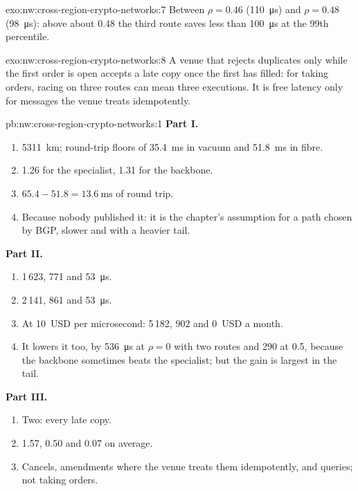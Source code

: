 \begin{solution}{exo:nw:cross-region-crypto-networks:7}
Between $\rho = 0.46$ (\qty{110}{\micro\second}) and $\rho = 0.48$ (\qty{98}{\micro\second}): above about 0.48 the third route saves less than
\qty{100}{\micro\second} at the 99th percentile.
\end{solution}

\begin{solution}{exo:nw:cross-region-crypto-networks:8}
A venue that rejects duplicates only while the first order is open accepts a late copy once the first has filled: for taking orders, racing on three
routes can mean three executions. It is free latency only for messages the venue treats idempotently.
\end{solution}

\begin{solution}{pb:nw:cross-region-crypto-networks:1}
\textbf{Part I.}
\begin{enumerate}
\item \qty{5311}{\kilo\metre}; round-trip floors of \qty{35.4}{\milli\second} in vacuum and \qty{51.8}{\milli\second} in fibre.
\item 1.26 for the specialist, 1.31 for the backbone.
\item $65.4 - 51.8 = \qty{13.6}{\milli\second}$ of round trip.
\item Because nobody published it: it is the chapter's assumption for a path chosen by BGP, slower and with a heavier tail.
\end{enumerate}
\textbf{Part II.}
\begin{enumerate}[resume]
\item 1\,623, 771 and \qty{53}{\micro\second}.
\item 2\,141, 861 and \qty{53}{\micro\second}.
\item At 10~USD per microsecond: 5\,182, 902 and 0~USD a month.
\item It lowers it too, by \qty{536}{\micro\second} at $\rho = 0$ with two routes and 290 at 0.5, because the backbone sometimes beats the
  specialist; but the gain is largest in the tail.
\end{enumerate}
\textbf{Part III.}
\begin{enumerate}[resume]
\item Two: every late copy.
\item 1.57, 0.50 and 0.07 on average.
\item Cancels, amendments where the venue treats them idempotently, and queries; not taking orders.

\end{enumerate}
\end{solution}
